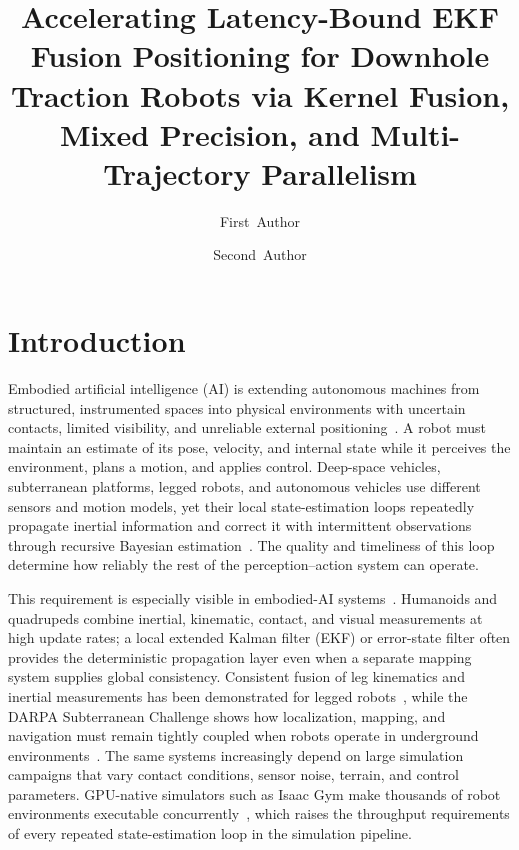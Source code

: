 \documentclass[research]{fcs}
\title{Accelerating Latency-Bound EKF Fusion Positioning for Downhole Traction Robots via Kernel Fusion, Mixed Precision, and Multi-Trajectory Parallelism}
\author[1,+]{First~Author}
\author[1]{Second~Author}
\begin{document}
\section{Introduction}
\label{sec:introduction}

Embodied artificial intelligence (AI) is extending autonomous machines from structured, instrumented spaces into physical environments with uncertain contacts, limited visibility, and unreliable external positioning~\cite{liu2025embodied-survey}. A robot must maintain an estimate of its pose, velocity, and internal state while it perceives the environment, plans a motion, and applies control. Deep-space vehicles, subterranean platforms, legged robots, and autonomous vehicles use different sensors and motion models, yet their local state-estimation loops repeatedly propagate inertial information and correct it with intermittent observations through recursive Bayesian estimation~\cite{he2024legged-state,ou2024leg-kilo}. The quality and timeliness of this loop determine how reliably the rest of the perception--action system can operate.

This requirement is especially visible in embodied-AI systems~\cite{embodied-ai-survey}. Humanoids and quadrupeds combine inertial, kinematic, contact, and visual measurements at high update rates; a local extended Kalman filter (EKF) or error-state filter often provides the deterministic propagation layer even when a separate mapping system supplies global consistency. Consistent fusion of leg kinematics and inertial measurements has been demonstrated for legged robots~\cite{bloesch2012}, while the DARPA Subterranean Challenge shows how localization, mapping, and navigation must remain tightly coupled when robots operate in underground environments~\cite{cerberus2022}. The same systems increasingly depend on large simulation campaigns that vary contact conditions, sensor noise, terrain, and control parameters. GPU-native simulators such as Isaac Gym make thousands of robot environments executable concurrently~\cite{isaacgym2021}, which raises the throughput requirements of every repeated state-estimation loop in the simulation pipeline.
\end{document}
